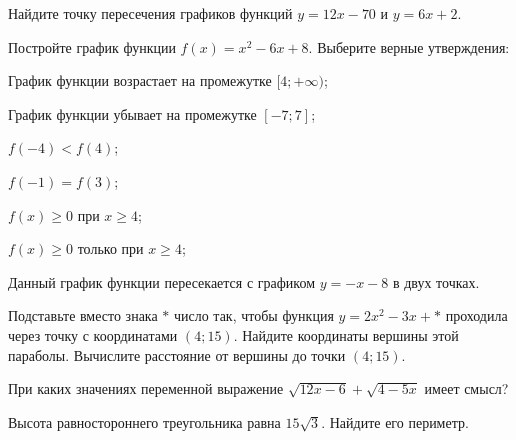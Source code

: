 \newpage
%
%
\begin{class}[number=2]
	\begin{listofex}
		\item Найдите точку пересечения графиков функций \( y=12x-70 \) и \( y=6x+2 \).
		\item Постройте график функции \( f(x)=x^2-6x+8 \). Выберите верные утверждения:
		\begin{enumcols}[itemcolumns=1]
			\item График функции возрастает на промежутке \( [4;+\infty) \);
			\item График функции убывает на промежутке \( [-7;7] \);
			\item \( f(-4)<f(4) \);
			\item \( f(-1)=f(3) \);
			\item \( f(x)\ge0 \) при \( x\ge4 \);
			\item \( f(x)\ge0 \) только при \( x\ge4 \);
			\item Данный график функции пересекается с графиком \( y=-x-8 \) в двух точках.
		\end{enumcols}
		\item Подставьте вместо знака \( * \) число так, чтобы функция \( y=2x^2-3x+* \) проходила через точку с координатами \( (4;15) \). Найдите координаты вершины этой параболы. Вычислите расстояние от вершины до точки \( (4;15) \).
		


		\item При каких значениях переменной выражение \( \sqrt{12x-6}+\sqrt{4-5x} \) имеет смысл?
		\item {}
		\item {}
		\item {}
		\item Высота равностороннего треугольника равна \( 15\sqrt{3} \). Найдите его периметр.
	\end{listofex}
\end{class}

